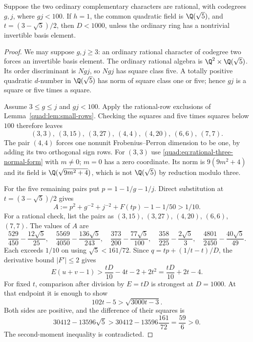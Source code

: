 \begin{lemma}\label{quad:opt:exceptional-rational}
Suppose the two ordinary complementary characters are rational, with
codegrees $g,j$, where $gj<100$. If $h=1$, the common quadratic field is
$\Q(\sqrt5)$, and $t=(3-\sqrt5)/2$, then $D<1000$, unless the
ordinary ring has a nontrivial invertible basis element.
\end{lemma}
\begin{proof}
We may suppose $g,j\ge3$: an ordinary rational character of codegree two
forces an invertible basis element. The ordinary rational algebra is
$\Q^2\times\Q(\sqrt5)$. Its order discriminant is $Ngj$,
so $Ngj$ has square class five. A totally positive quadratic $d$-number
in $\Q(\sqrt5)$ has norm of square class one or five; hence
$gj$ is a square or five times a square.

Assume $3\le g\le j$ and $gj<100$. Apply the rational-row exclusions of Lemma~\ref{quad:lem:small-rows}.
Checking the
squares and five times squares below $100$ therefore leaves
\[
 (3,3),\ (3,15),\ (3,27),\ (4,4),\ (4,20),\ (6,6),\ (7,7).
\]
The pair $(4,4)$ forces one nonunit Frobenius--Perron dimension to be
one, by adding its two orthogonal sign rows. For $(3,3)$ use \eqref{quad:eq:rational-three-normal-form} with
$m\ne0$; $m=0$ has a zero coordinate. Its norm is $9(9m^2+4)$ and
its field is
$\Q(\sqrt{9m^2+4})$, which is not
$\Q(\sqrt5)$ by reduction modulo three.

For the five remaining pairs put $p=1-1/g-1/j$. Direct substitution
at $t=(3-\sqrt5)/2$ gives
\[
 A:=p^2+g^{-2}+j^{-2}+F(tp)-1-1/50>1/10.
\]
For a rational check, list the pairs as
$(3,15)$, $(3,27)$, $(4,20)$, $(6,6)$, $(7,7)$. The values of $A$ are
\[
 \frac{529}{450}-\frac{12\sqrt5}{25},\quad
 \frac{5569}{4050}-\frac{136\sqrt5}{243},\quad
 \frac{373}{200}-\frac{77\sqrt5}{100},\quad
 \frac{358}{225}-\frac{2\sqrt5}{3},\quad
 \frac{4801}{2450}-\frac{40\sqrt5}{49}.
\]
Each exceeds $1/10$ on using $\sqrt5<161/72$.
Since $q=tp+(1/t-t)/D$, the derivative bound $|F'|\le2$ gives
\[
 E(u+v-1)>\frac{tD}{10}-4t-2+2t^2
 =\frac{tD}{10}+2t-4.
\]
For fixed $t$, comparison after division by $E=tD$ is strongest at
$D=1000$. At that endpoint it is enough to show
\[
 102t-5>\sqrt{3000t-3}.
\]
Both sides are positive, and the difference of their squares is
\[
 30412-13596\sqrt5>30412-13596\frac{161}{72}
 =\frac{59}{6}>0.
\]
The second-moment inequality is contradicted.
\end{proof}

